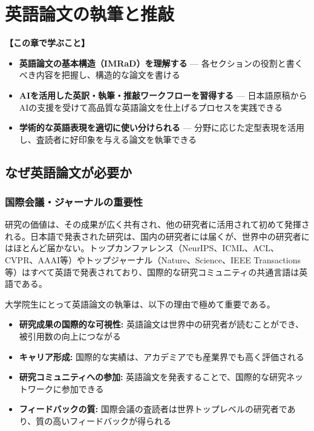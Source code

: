 \chapter{英語論文の執筆と推敲}
\label{chap4}

\begin{chapterbox}
\textbf{【この章で学ぶこと】}
\begin{itemize}
\item \textbf{英語論文の基本構造（IMRaD）を理解する} --- 各セクションの役割と書くべき内容を把握し、構造的な論文を書ける
\item \textbf{AIを活用した英訳・執筆・推敲ワークフローを習得する} --- 日本語原稿からAIの支援を受けて高品質な英語論文を仕上げるプロセスを実践できる
\item \textbf{学術的な英語表現を適切に使い分けられる} --- 分野に応じた定型表現を活用し、査読者に好印象を与える論文を執筆できる
\end{itemize}
\end{chapterbox}
\vspace{5mm}

\section{なぜ英語論文が必要か}
\label{sec:4.1}

\subsection{国際会議・ジャーナルの重要性}

研究の価値は、その成果が広く共有され、他の研究者に活用されて初めて発揮される。日本語で発表された研究は、国内の研究者には届くが、世界中の研究者にはほとんど届かない。トップカンファレンス（NeurIPS、ICML、ACL、CVPR、AAAI等）やトップジャーナル（Nature、Science、IEEE Transactions等）はすべて英語で発表されており、国際的な研究コミュニティの共通言語は英語である。

大学院生にとって英語論文の執筆は、以下の理由で極めて重要である。

\begin{itemize}
\item \textbf{研究成果の国際的な可視性:} 英語論文は世界中の研究者が読むことができ、被引用数の向上につながる
\item \textbf{キャリア形成:} 国際的な実績は、アカデミアでも産業界でも高く評価される
\item \textbf{研究コミュニティへの参加:} 英語論文を発表することで、国際的な研究ネットワークに参加できる
\item \textbf{フィードバックの質:} 国際会議の査読者は世界トップレベルの研究者であり、質の高いフィードバックが得られる
\end{itemize}

